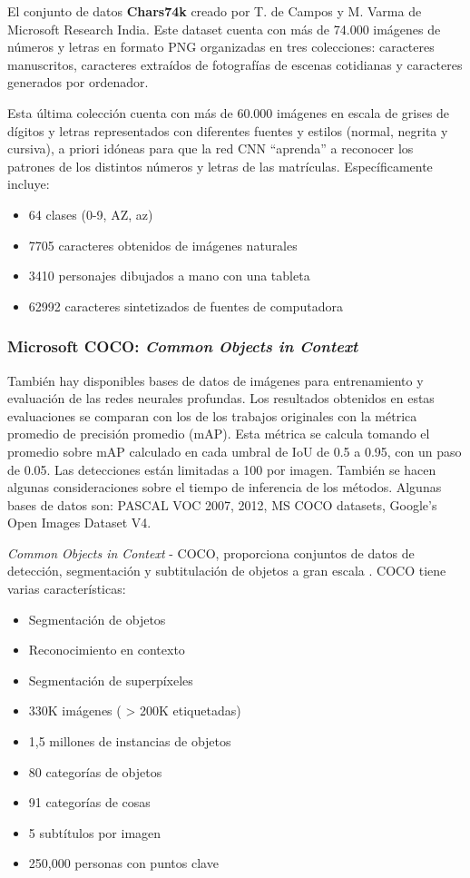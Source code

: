 El conjunto de datos \textbf{Chars74k} creado por T. de Campos y M. Varma de Microsoft Research India\cite{de2012chars74k}. Este dataset cuenta con más de 74.000 imágenes de números y letras en formato PNG organizadas en tres colecciones: caracteres manuscritos, caracteres extraídos de fotografías de escenas cotidianas y caracteres generados por ordenador.

Esta última colección cuenta con más de 60.000 imágenes en escala de grises de dígitos y letras representados con diferentes fuentes y estilos (normal, negrita y cursiva), a priori idóneas para que la red CNN “aprenda” a reconocer los patrones de los distintos números y letras de las matrículas\cite{de2009chars74k}. Específicamente incluye:

\begin{itemize}
    \item 64 clases (0-9, AZ, az)
    \item 7705 caracteres obtenidos de imágenes naturales
    \item 3410 personajes dibujados a mano con una tableta
    \item 62992 caracteres sintetizados de fuentes de computadora
\end{itemize}

\subsubsection{Microsoft COCO: \textit{Common Objects in Context}}
\label{sec:coco}
También hay disponibles bases de datos de imágenes para entrenamiento y evaluación de las redes neurales profundas. Los resultados obtenidos en estas evaluaciones se comparan con los de los trabajos originales con la métrica promedio de precisión promedio (mAP). Esta métrica se calcula tomando el promedio sobre mAP calculado en cada umbral de IoU de 0.5 a 0.95, con un paso de 0.05. Las detecciones están limitadas a 100 por imagen. También se hacen algunas consideraciones sobre el tiempo de inferencia de los métodos. Algunas bases de datos son: PASCAL VOC 2007, 2012, MS COCO datasets, Google’s Open Images Dataset V4.

\textit{Common Objects in Context} - COCO, proporciona conjuntos de datos de detección, segmentación y subtitulación de objetos a gran escala \cite{lin2014microsoft}. COCO tiene varias características:

\begin{itemize}
    \item Segmentación de objetos
    \item Reconocimiento en contexto
    \item Segmentación de superpíxeles
    \item 330K imágenes ( > 200K etiquetadas)
    \item 1,5 millones de instancias de objetos
\item 80 categorías de objetos
\item 91 categorías de cosas
\item 5 subtítulos por imagen
\item 250,000 personas con puntos clave
\end{itemize}

